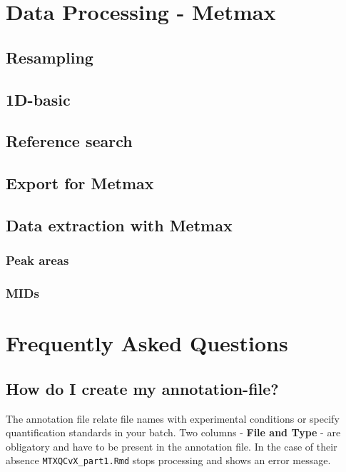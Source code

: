 \documentclass[]{book}
\theoremstyle{definition}
\theoremstyle{definition}
\theoremstyle{definition}
\theoremstyle{remark}
\begin{document}
\chapter{Data Processing - Metmax}\label{metmaxproc}

\section{Resampling}\label{resampling-1}

\section{1D-basic}\label{d-basic}

\section{Reference search}\label{reference-search}

\section{Export for Metmax}\label{export-for-metmax}

\section{Data extraction with Metmax}\label{data-extraction-with-metmax}

\subsection{Peak areas}\label{peak-areas}

\subsection{MIDs}\label{mids}

\chapter{Frequently Asked Questions}\label{FAQ}

\section{How do I create my annotation-file?}\label{createannotation}

The annotation file relate file names with experimental conditions or
specify quantification standards in your batch. Two columns -
\textbf{File and Type} - are obligatory and have to be present in the
annotation file. In the case of their absence
\texttt{MTXQCvX\_part1.Rmd} stops processing and shows an error message.
\end{document}
